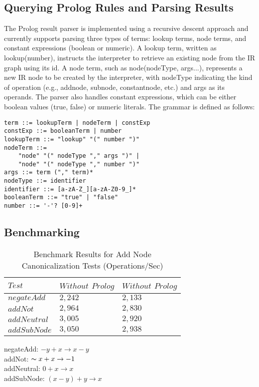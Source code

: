 \subsection{Querying Prolog Rules and Parsing Results}
The Prolog result parser is implemented using a recursive descent approach and currently supports parsing three types of terms: lookup terms, node terms, and constant expressions (boolean or numeric). A lookup term, written as lookup(number), instructs the interpreter to retrieve an existing node from the IR graph using its id. A node term, such as node(nodeType, args...), represents a new IR node to be created by the interpreter, with nodeType indicating the kind of operation (e.g., addnode, subnode, constantnode, etc.) and args as its operands. The parser also handles constant expressions, which can be either boolean values (true, false) or numeric literals. The grammar is defined as follows:
\begin{lstlisting}
term ::= lookupTerm | nodeTerm | constExp  
constExp ::= booleanTerm | number  
lookupTerm ::= "lookup" "(" number ")"  
nodeTerm ::= 
    "node" "(" nodeType "," args ")" | 
    "node" "(" nodeType "," number ")"  
args ::= term ("," term)*  
nodeType ::= identifier
identifier ::= [a-zA-Z_][a-zA-Z0-9_]*  
booleanTerm ::= "true" | "false"  
number ::= '-'? [0-9]+
\end{lstlisting}

\subsection{Benchmarking}

\begin{table}[h]
    \centering
    \fontsize{9pt}{9pt}
    \begin{tabular}{|l|l|l|}
        \hline
        $Test$ & $Without$ $Prolog$ & $Without$ $Prolog$ \\
        \hline
        $negateAdd$ & $2,242$ & $2,133$ \\
        $addNot$ & $2,964$ & $2,830$ \\
        $addNeutral$ & $3,005$ & $2,920$ \\
        $addSubNode$ & $3,050$ & $2,938$ \\
        \hline
    \end{tabular}
    \caption{Benchmark Results for Add Node Canonicalization Tests (Operations/Sec)}
    \label{table:Canonicalization}
\end{table} 
\smallbreak

\noindent  negateAdd:  $-y + x \rightarrow x - y$\\
addNot: $\thicksim x + x \rightarrow -1$\\
addNeutral: $0 + x \rightarrow x$\\
addSubNode: $(x - y) + y \rightarrow x$\\


